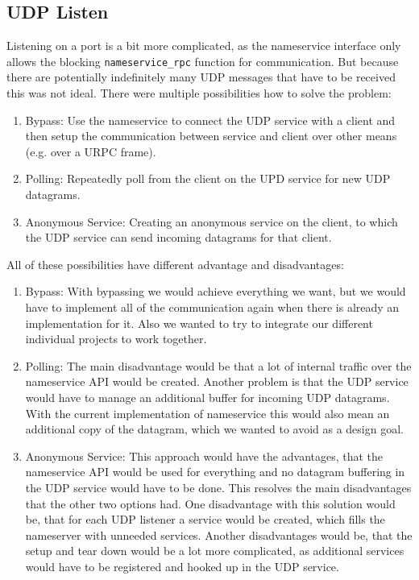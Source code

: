 \subsection{UDP Listen}
Listening on a port is a bit more complicated, as the nameservice interface only allows the blocking \verb|nameservice_rpc| function for communication. But because there are potentially indefinitely many UDP messages that have to be received this was not ideal. There were multiple possibilities how to solve the problem:
\begin{enumerate}
  \item Bypass: Use the nameservice to connect the UDP service with a client and then setup the communication between service and client over other means (e.g. over a URPC frame).
  \item Polling: Repeatedly poll from the client on the UPD service for new UDP datagrams.
  \item Anonymous Service: Creating an anonymous service on the client, to which the UDP service can send incoming datagrams for that client.
\end{enumerate}

All of these possibilities have different advantage and disadvantages:
\begin{enumerate}
  \item Bypass: With bypassing we would achieve everything we want, but we would have to implement all of the communication again when there is already an implementation for it. Also we wanted to try to integrate our different individual projects to work together.
  \item Polling: The main disadvantage would be that a lot of internal traffic over the nameservice API would be created. Another problem is that the UDP service would have to manage an additional buffer for incoming UDP datagrams. With the current implementation of nameservice this would also mean an additional copy of the datagram, which we wanted to avoid as a design goal.
  \item Anonymous Service: This approach would have the advantages, that the nameservice API would be used for everything and no datagram buffering in the UDP service would have to be done. This resolves the main disadvantages that the other two options had. One disadvantage with this solution would be, that for each UDP listener a service would be created, which fills the nameserver with unneeded services. Another disadvantages would be, that the setup and tear down would be a lot more complicated, as additional services would have to be registered and hooked up in the UDP service.
\end{enumerate}

